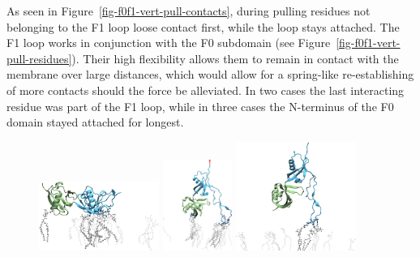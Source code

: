 \documentclass[
  twocolumn]{biophys-new-mod}
\begin{document}
As seen in Figure~\ref{fig-f0f1-vert-pull-contacts}, during pulling
residues not belonging to the F1 loop loose contact first, while the
loop stays attached. The F1 loop works in conjunction with the F0
subdomain (see Figure~\ref{fig-f0f1-vert-pull-residues}). Their high
flexibility allows them to remain in contact with the membrane over
large distances, which would allow for a spring-like re-establishing of
more contacts should the force be alleviated. In two cases the last
interacting residue was part of the F1 loop, while in three cases the
N-terminus of the F0 domain stayed attached for longest.

\begin{figure}

\begin{minipage}[t]{\linewidth}

{\centering 

\includegraphics[width=0.35\textwidth,height=\textheight]{./assets/vmd/f0f1-pulling/f0f1-pull-start.png}
\includegraphics[width=0.2\textwidth,height=\textheight]{./assets/vmd/f0f1-pulling/f0f1-pull-middle.png}
\includegraphics[width=0.35\textwidth,height=\textheight]{./assets/vmd/f0f1-pulling/f0f1-pull-end.png}

}

\subcaption{\label{fig-f0f1-pull-run-1}~}
\end{minipage}%
\newline
\begin{minipage}[t]{0.50\linewidth}


\end{minipage}
\end{figure}
\end{document}
